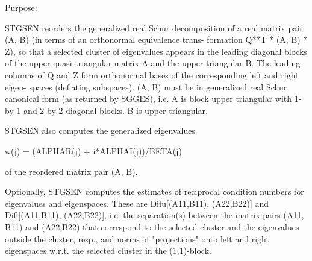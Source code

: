  \begin{DoxyParagraph}{Purpose\+: }
\begin{DoxyVerb} STGSEN reorders the generalized real Schur decomposition of a real
 matrix pair (A, B) (in terms of an orthonormal equivalence trans-
 formation Q**T * (A, B) * Z), so that a selected cluster of eigenvalues
 appears in the leading diagonal blocks of the upper quasi-triangular
 matrix A and the upper triangular B. The leading columns of Q and
 Z form orthonormal bases of the corresponding left and right eigen-
 spaces (deflating subspaces). (A, B) must be in generalized real
 Schur canonical form (as returned by SGGES), i.e. A is block upper
 triangular with 1-by-1 and 2-by-2 diagonal blocks. B is upper
 triangular.

 STGSEN also computes the generalized eigenvalues

             w(j) = (ALPHAR(j) + i*ALPHAI(j))/BETA(j)

 of the reordered matrix pair (A, B).

 Optionally, STGSEN computes the estimates of reciprocal condition
 numbers for eigenvalues and eigenspaces. These are Difu[(A11,B11),
 (A22,B22)] and Difl[(A11,B11), (A22,B22)], i.e. the separation(s)
 between the matrix pairs (A11, B11) and (A22,B22) that correspond to
 the selected cluster and the eigenvalues outside the cluster, resp.,
 and norms of "projections" onto left and right eigenspaces w.r.t.
 the selected cluster in the (1,1)-block.\end{DoxyVerb}
 
\end{DoxyParagraph}

